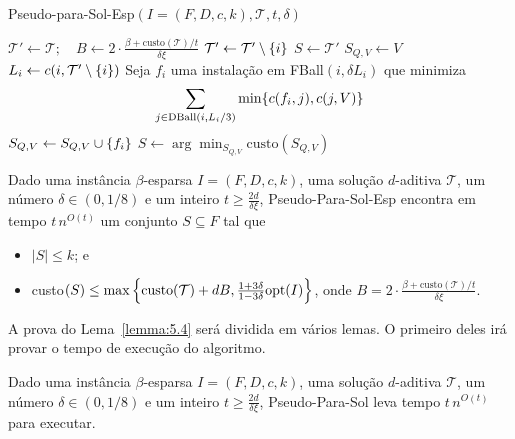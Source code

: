 \begin{algorithm}
    \caption{\sc Pseudo-para-Sol-Esp$(I = (F,D,c,k), \mathcal{T}, t, \delta)$}
    \begin{algorithmic}[1]
        \State $\mathcal{T}' \gets \mathcal{T}; \quad B \gets 2 \cdot \frac{\beta + \text{custo}(\mathcal{T})/t}{\delta\xi}$
        \State $\mathcal{T}' \gets \mathcal{T}' \setminus \{i\}$
        \EndWhile
        \State \Return $S \gets \mathcal{T}'$
        \EndIf
            \State $S_{Q,V} \gets V$
                \State $L_i \gets c(i,\mathcal{T}' \setminus \{i\})$
                \State Seja $f_i$ uma instalação em FBall$(i, \delta L_i)$ que minimiza \[\sum_{j \in \text{DBall}(i,L_i/3)} \min\{c(f_i,j),c(j,V)\}\]
                \State $S_{Q,V} \gets S_{Q,V} \cup \{f_i\}$
            \EndFor
        \EndFor
        \State \Return $S \gets \arg\min_{S_{Q,V}} \text{custo}(S_{Q,V})$
    \end{algorithmic}
\end{algorithm}

\begin{lemma} \label{lemma:5.4}
    Dado uma instância $\beta$-esparsa $I = (F,D,c,k)$, uma solução $d$-aditiva $\mathcal{T}$, um número $\delta \in (0,1/8)$ e um inteiro $t \geq \frac{2d}{\delta \xi}$, {\sc Pseudo-Para-Sol-Esp} encontra em tempo $t\, n^{O(t)}$ um conjunto $S \subseteq F$ tal que 
    \begin{itemize}
        \item $|S| \leq k$; e
        \item custo$(S) \leq \max \left\{ \text{custo}(\mathcal{T}) + dB, \frac{1+3\delta}{1-3\delta} \mathrm{opt}(I)\right\}$, onde $B = 2 \cdot \frac{\beta + \text{custo}(\mathcal{T})/t}{\delta\xi}$.
    \end{itemize}
\end{lemma}

A prova do Lema~\ref{lemma:5.4} será dividida em vários lemas. O primeiro deles irá provar o tempo de execução do algoritmo.

\begin{lemma}
    Dado uma instância $\beta$-esparsa $I = (F,D,c,k)$, uma solução $d$-aditiva $\mathcal{T}$, um número $\delta \in (0,1/8)$ e um inteiro $t \geq \frac{2d}{\delta \xi}$, {\sc Pseudo-Para-Sol} leva tempo $t\, n^{O(t)}$ para executar.
\end{lemma}

